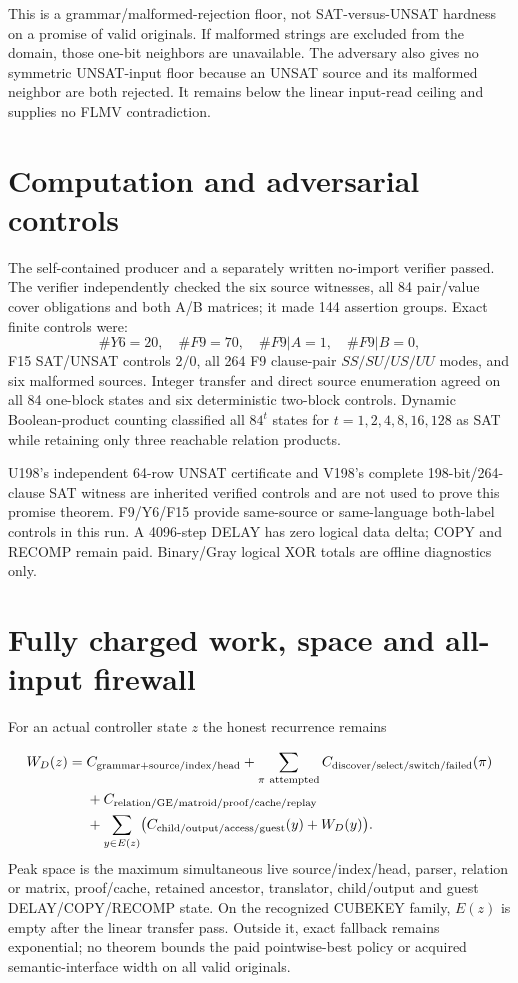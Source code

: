 \documentclass[11pt]{article}
\begin{document}
This is a grammar/malformed-rejection floor, not SAT-versus-UNSAT hardness on a promise of valid originals.  If malformed strings are excluded from the domain, those one-bit neighbors are unavailable.  The adversary also gives no symmetric UNSAT-input floor because an UNSAT source and its malformed neighbor are both rejected.  It remains below the linear input-read ceiling and supplies no FLMV contradiction.

\section{Computation and adversarial controls}
The self-contained producer and a separately written no-import verifier passed.  The verifier independently checked the six source witnesses, all 84 pair/value cover obligations and both A/B matrices; it made 144 assertion groups.  Exact finite controls were:
\[
\#Y6=20,\quad \#F9=70,\quad \#F9|A=1,\quad \#F9|B=0,
\]
F15 SAT/UNSAT controls $2/0$, all 264 F9 clause-pair $SS/SU/US/UU$ modes, and six malformed sources.  Integer transfer and direct source enumeration agreed on all 84 one-block states and six deterministic two-block controls.  Dynamic Boolean-product counting classified all $84^t$ states for $t=1,2,4,8,16,128$ as SAT while retaining only three reachable relation products.

U198's independent 64-row UNSAT certificate and V198's complete 198-bit/264-clause SAT witness are inherited verified controls and are not used to prove this promise theorem.  F9/Y6/F15 provide same-source or same-language both-label controls in this run.  A 4096-step DELAY has zero logical data delta; COPY and RECOMP remain paid.  Binary/Gray logical XOR totals are offline diagnostics only.

\section{Fully charged work, space and all-input firewall}
For an actual controller state $z$ the honest recurrence remains

\[
\begin{aligned}
 W_D(z)={}&C_{\rm grammar+source/index/head}
 +\sum_{\pi\ {\rm attempted}}C_{\rm discover/select/switch/failed}(\pi)\\
 &+C_{\rm relation/GE/matroid/proof/cache/replay}\\
 &+\sum_{y\in E(z)}\bigl(C_{\rm child/output/access/guest}(y)+W_D(y)\bigr).
\end{aligned}
\]
Peak space is the maximum simultaneous live source/index/head, parser, relation or matrix, proof/cache, retained ancestor, translator, child/output and guest DELAY/COPY/RECOMP state.  On the recognized CUBEKEY family, $E(z)$ is empty after the linear transfer pass.  Outside it, exact fallback remains exponential; no theorem bounds the paid pointwise-best policy or acquired semantic-interface width on all valid originals.
\end{document}
